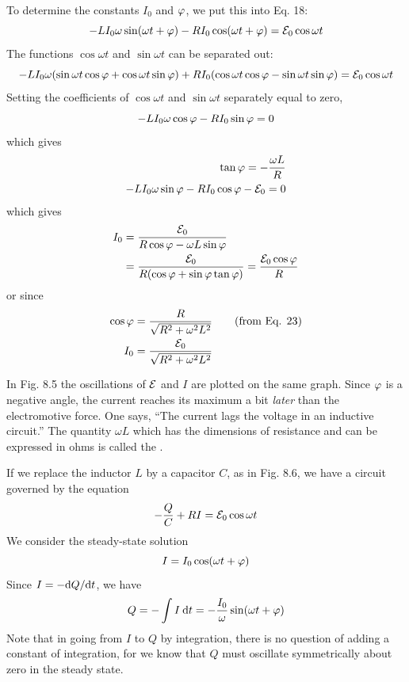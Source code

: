 To determine the constants $I_0$ and $\varphi$, we put this into Eq. 18:
\begin{equation}
  -LI_0\omega \sin (\omega t + \varphi) - RI_0 \cos (\omega t + \varphi) = \mathcal{E}_0 \cos \omega t
\end{equation}
The functions $\cos \omega t$ and $\sin \omega t$ can be separated out:
\begin{equation}
  -LI_0\omega(\sin\omega t\cos\varphi + \cos\omega t\sin\varphi)
     + RI_0(\cos\omega t\cos\varphi - \sin\omega t\sin\varphi) = \mathcal{E}_0 \cos\omega t
\end{equation}
Setting the coefficients of $\cos \omega t$ and $\sin \omega t$ separately equal to zero,
\begin{equation}
  -LI_0\omega \cos\varphi - RI_0\sin\varphi = 0
\end{equation}
which gives
\begin{align}
  \tan\varphi = -\frac{\omega L}{R}& \\
  -LI_0\omega \sin\varphi - RI_0\cos\varphi - \mathcal{E}_0 = 0
\end{align}
which gives
\begin{align}
\begin{split}
  I_0 &= \frac{\mathcal{E}_0}{R\cos\varphi-\omega L\sin\varphi} \\
      &= \frac{\mathcal{E}_0}{R(\cos\varphi+\sin\varphi\tan\varphi)} = \frac{\mathcal{E}_0\cos\varphi}{R}
\end{split}  
\end{align}
or since
\begin{align}
  \cos\varphi &= \frac{R}{\sqrt{R^2+\omega^2L^2}}   \qquad (\text{from Eq. 23}) \\
  I_0 &= \frac{\mathcal{E}_0}{\sqrt{R^2+\omega^2L^2}}
\end{align}

In Fig. 8.5 the oscillations of $\mathcal{E}$ and $I$ are plotted on the same graph.
Since $\varphi$ is a negative angle, the current reaches its maximum a bit
\emph{later} than the electromotive force. One says, ``The current lags the
voltage in an inductive circuit.'' The quantity $\omega L$ which has the
dimensions of resistance and can be expressed in ohms is called the
.

If we replace the inductor $L$ by a capacitor $C$, as in Fig. 8.6, we
have a circuit governed by the equation
\begin{equation}
  -\frac{Q}{C} + RI = \mathcal{E}_0\cos\omega t
\end{equation}
We consider the steady-state solution
\begin{equation}
  I = I_0 \cos (\omega t + \varphi)
\end{equation}
Since $I=-\textup{d} Q/\textup{d} t$, we have
\begin{equation}
  Q = -\int I\:\textup{d} t = -\frac{I_0}{\omega}\sin(\omega t+\varphi)
\end{equation}
Note that in going from $I$ to $Q$ by integration, there is no question
of adding a constant of integration, for we know that $Q$ must oscillate
symmetrically about zero in the steady state.

